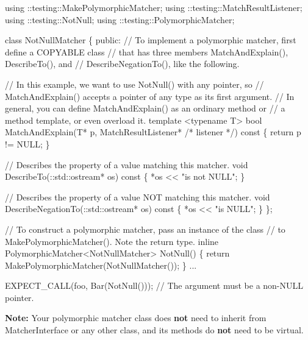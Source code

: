 \begin{DoxyCode}
using ::testing::MakePolymorphicMatcher;
using ::testing::MatchResultListener;
using ::testing::NotNull;
using ::testing::PolymorphicMatcher;

\textcolor{keyword}{class }NotNullMatcher \{
 \textcolor{keyword}{public}:
  \textcolor{comment}{// To implement a polymorphic matcher, first define a COPYABLE class}
  \textcolor{comment}{// that has three members MatchAndExplain(), DescribeTo(), and}
  \textcolor{comment}{// DescribeNegationTo(), like the following.}

  \textcolor{comment}{// In this example, we want to use NotNull() with any pointer, so}
  \textcolor{comment}{// MatchAndExplain() accepts a pointer of any type as its first argument.}
  \textcolor{comment}{// In general, you can define MatchAndExplain() as an ordinary method or}
  \textcolor{comment}{// a method template, or even overload it.}
  \textcolor{keyword}{template} <\textcolor{keyword}{typename} T>
  \textcolor{keywordtype}{bool} MatchAndExplain(T* p,
                       MatchResultListener* \textcolor{comment}{/* listener */})\textcolor{keyword}{ const }\{
    \textcolor{keywordflow}{return} p != NULL;
  \}

  \textcolor{comment}{// Describes the property of a value matching this matcher.}
  \textcolor{keywordtype}{void} DescribeTo(::std::ostream* os)\textcolor{keyword}{ const }\{ *os << \textcolor{stringliteral}{"is not NULL"}; \}

  \textcolor{comment}{// Describes the property of a value NOT matching this matcher.}
  \textcolor{keywordtype}{void} DescribeNegationTo(::std::ostream* os)\textcolor{keyword}{ const }\{ *os << \textcolor{stringliteral}{"is NULL"}; \}
\};

\textcolor{comment}{// To construct a polymorphic matcher, pass an instance of the class}
\textcolor{comment}{// to MakePolymorphicMatcher().  Note the return type.}
\textcolor{keyword}{inline} PolymorphicMatcher<NotNullMatcher> NotNull() \{
  \textcolor{keywordflow}{return} MakePolymorphicMatcher(NotNullMatcher());
\}
...

  EXPECT\_CALL(foo, Bar(NotNull()));  \textcolor{comment}{// The argument must be a non-NULL pointer.}
\end{DoxyCode}


{\bfseries Note\+:} Your polymorphic matcher class does {\bfseries not} need to inherit from {\ttfamily Matcher\+Interface} or any other class, and its methods do {\bfseries not} need to be virtual.

